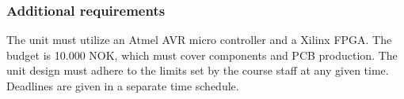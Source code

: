 \subsubsection*{Additional requirements}
The unit must utilize an Atmel AVR micro controller and a Xilinx FPGA. The
budget is 10.000 NOK, which must cover components and PCB production. The unit
design must adhere to the limits set by the course staff at any given
time. Deadlines are given in a separate time schedule.
